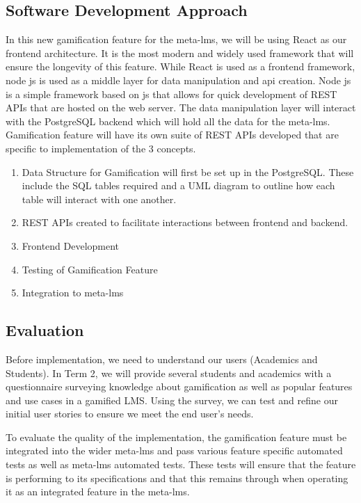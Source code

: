 \subsection{Software Development Approach}
In this new gamification feature for the meta-lms, we will be using React as our frontend architecture. It is the most modern and widely used framework that will ensure the longevity of this feature.
While React is used as a frontend framework, node js is used as a middle layer for data manipulation and api creation. Node js is a simple framework based on js that allows for quick development of REST APIs that are hosted on the web server. The data manipulation layer will interact with the PostgreSQL backend which will hold all the data for the meta-lms.
Gamification feature will have its own suite of REST APIs developed that are specific to implementation of the 3 concepts.

\begin{enumerate}
    \item Data Structure for Gamification will first be set up in the PostgreSQL. These include the SQL tables required and a UML diagram to outline how each table will interact with one another.
    \item REST APIs created to facilitate interactions between frontend and backend.
    \item Frontend Development
    \item Testing of Gamification Feature
    \item Integration to meta-lms
\end{enumerate}

\subsection{Evaluation}
Before implementation, we need to understand our users (Academics and Students). In Term 2, we will provide several students and academics with a questionnaire surveying knowledge about gamification as well as popular features and use cases in a gamified LMS. Using the survey, we can test and refine our initial user stories to ensure we meet the end user’s needs.

To evaluate the quality of the implementation, the gamification feature must be integrated into the wider meta-lms and pass various feature specific automated tests as well as meta-lms automated tests. These tests will ensure that the feature is performing to its specifications and that this remains through when operating it as an integrated feature in the meta-lms.

